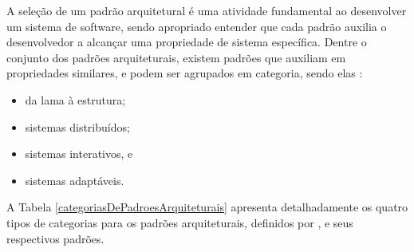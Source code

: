 A seleção de um padrão arquitetural é uma atividade fundamental ao desenvolver um sistema de software, sendo apropriado entender que cada padrão auxilia o desenvolvedor a alcançar uma propriedade de sistema específica. Dentre o conjunto dos padrões arquiteturais, existem padrões que auxiliam em propriedades similares, e podem ser agrupados em categoria, sendo elas \cite{buschmann1996system}:

\begin{itemize}
	
	\item da lama à estrutura;
	
	\item sistemas distribuídos;
	
	\item sistemas interativos, e
	
	\item sistemas adaptáveis.

\end{itemize}

A Tabela \ref{categoriasDePadroesArquiteturais} apresenta detalhadamente os quatro tipos de categorias para os padrões arquiteturais, definidos por \cite{buschmann1996system}, e seus respectivos padrões.

